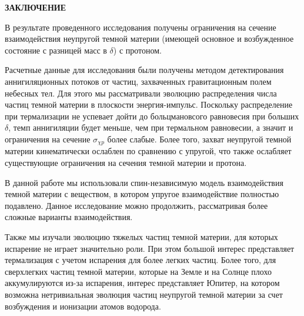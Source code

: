 \clearpage
\newpage
\begin{center}
	\textbf{\large ЗАКЛЮЧЕНИЕ}
\end{center}


В результате проведенного исследования получены ограничения на сечение взаимодействия неупругой темной материи (имеющей основное и возбужденное состояние с разницей масс в $\delta$) с протоном. 

Расчетные данные для исследования были получены методом детектирования аннигиляционных потоков от частиц, захваченных гравитационным полем небесных тел. Для этого мы рассматривали эволюцию распределения числа частиц темной материи в плоскости энергия-импульс. Поскольку распределение при термализации не успевает дойти до больцмановсого равновесия при больших $\delta$, темп аннигиляции будет меньше, чем при термальном равновесии, а значит и ограничения на сечение $\sigma_{\chi p}$  более слабые. Более того, захват неупругой темной материи кинематически ослаблен по сравнению с упругой, что также ослабляет существующие ограничения на сечения темной материи и протона.

В данной работе мы использовали спин-независимую модель взаимодействия темной материи с веществом, в котором упругое взаимодействие полностью подавлено. Данное исследование можно продолжить, рассматривая более сложные варианты взаимодействия.

Также мы изучали эволюцию тяжелых частиц темной материи, для которых испарение не играет значительно роли. При этом большой интерес представляет термализация с учетом испарения для более легких частиц. Более того, для сверхлегких частиц темной материи, которые на Земле и на Солнце плохо аккумулируются из-за испарения, интерес представляет Юпитер, на котором возможна нетривиальная эволюция частиц неупругой темной материи за счет возбуждения и ионизации атомов водорода.